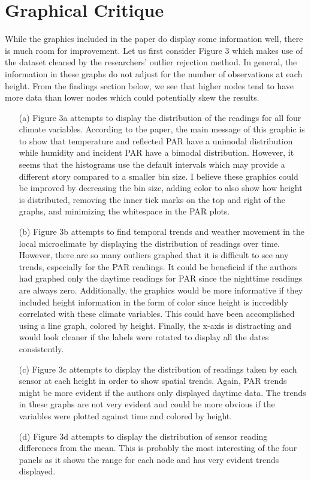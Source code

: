\documentclass[11pt]{article}
\begin{document}
\section{Graphical Critique}
While the graphics included in the paper do display some information well, there is much room for improvement. Let us first consider Figure 3 which makes use of the dataset cleaned by the researchers' outlier rejection method. In general, the information in these graphs do not adjust for the number of observations at each height. From the findings section below, we see that higher nodes tend to have more data than lower nodes which could potentially skew the results. 
\begin{enumerate}
\item[(a)]
Figure 3a attempts to display the distribution of the readings for all four climate variables. According to the paper, the main message of this graphic is to show that temperature and reflected PAR have a unimodal distribution while humidity and incident PAR have a bimodal distribution. However, it seems that the histograms use the default intervals which may provide a different story compared to a smaller bin size. I believe these graphics could be improved by decreasing the bin size, adding color to also show how height is distributed, removing the inner tick marks on the top and right of the graphs, and minimizing the whitespace in the PAR plots.  

\item[(b)]
Figure 3b attempts to find temporal trends and weather movement in the local microclimate by displaying the distribution of readings over time. However, there are so many outliers graphed that it is difficult to see any trends, especially for the PAR readings. It could be beneficial if the authors had graphed only the daytime readings for PAR since the nighttime readings are always zero. Additionally, the graphics would be more informative if they included height information in the form of color since height is incredibly correlated with these climate variables. This could have been accomplished using a line graph, colored by height. Finally, the x-axis is distracting and would look cleaner if the labels were rotated to display all the dates consistently. 

\item[(c)]
Figure 3c attempts to display the distribution of readings taken by each sensor at each height in order to show spatial trends. Again, PAR trends might be more evident if the authors only displayed daytime data. The trends in these graphs are not very evident and could be more obvious if the variables were plotted against time and colored by height. 

\item[(d)]
Figure 3d attempts to display the distribution of sensor reading differences from the mean. This is probably the most interesting of the four panels as it shows the range for each node and has very evident trends displayed. 

\end{enumerate}
\end{document}
